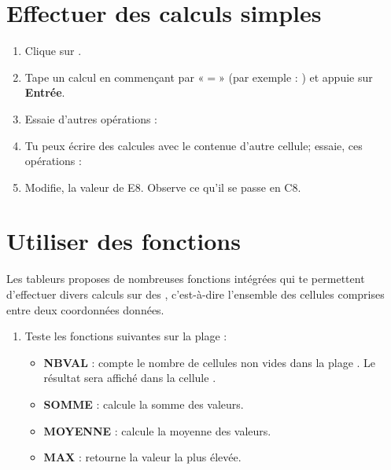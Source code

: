 
\section{Effectuer des calculs simples}

\begin{enumerate}
    \item Clique sur \cell[C6].
    \item Tape un calcul en commençant par «$=$» (par exemple : \ccalc[3+5]) et appuie sur \textbf{Entrée}.
    \item Essaie d'autres opérations :
    \item Tu peux écrire des calcules avec le contenue d'autre cellule; essaie, ces opérations :
    \item Modifie, la valeur de E8. Observe ce qu'il se passe en C8.
\end{enumerate}

\section{Utiliser des fonctions}

Les tableurs proposes de nombreuses fonctions intégrées qui te permettent d'effectuer divers calculs sur des , c'est-à-dire l'ensemble des cellules comprises entre deux coordonnées données.

\begin{enumerate} 
        \item Teste les fonctions suivantes sur la plage \cell[D11:G12] :
        \begin{itemize}
            \item \textbf{NBVAL} : \cell[C15] \ccalc[NBVAL(D11:G12)] compte le nombre de cellules non vides dans la plage \cell[D11:G12].
            Le résultat sera affiché dans la cellule \cell[C15].
            \item \textbf{SOMME} : \cell[D15] \ccalc[SOMME(D11:G12)] calcule la somme des valeurs.
            \item \textbf{MOYENNE} : \cell[E15] \ccalc[MOYENNE(D11:G12)] calcule la moyenne des valeurs.
            \item \textbf{MAX} : \cell[F15] \ccalc[MAX(D11:G12)] retourne la valeur la plus élevée.
    \end{itemize}
\end{enumerate}

